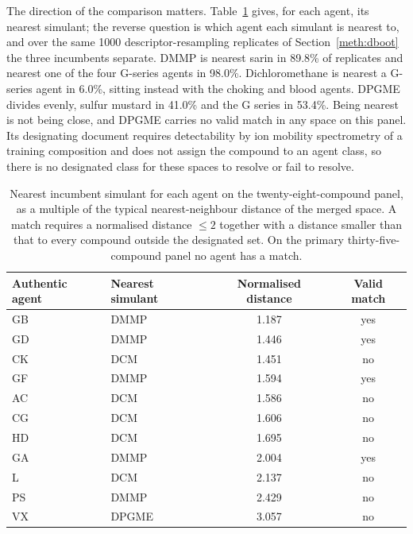 \documentclass[1p,times]{elsarticle}
\begin{document}
The direction of the comparison matters. Table~\ref{tab:match} gives, for each
agent, its nearest simulant; the reverse question is which agent each simulant
is nearest to, and over the same 1000 descriptor-resampling replicates of
Section~\ref{meth:dboot} the three incumbents separate. DMMP is nearest sarin in
89.8\% of replicates and nearest one of the four G-series agents in 98.0\%.
Dichloromethane is nearest a G-series agent in 6.0\%, sitting instead with the
choking and blood agents. DPGME divides evenly, sulfur mustard in 41.0\% and the
G series in 53.4\%. %
Being nearest is not being close, and DPGME carries no valid
match in any space on this panel. Its designating document requires
detectability by ion mobility spectrometry of a training composition and does
not assign the compound to an agent class,\cite{seitzinger2006simulant} so
there is no designated class for these spaces to resolve or fail to resolve.

\begin{table}[!htb]
\centering
\caption{Nearest incumbent simulant for each agent on the twenty-eight-compound
panel, as a multiple of the typical nearest-neighbour distance of the merged
space. A match requires a normalised distance $\le 2$ together with a distance
smaller than that to every compound outside the designated set. On the primary
thirty-five-compound panel no agent has a match.}
\label{tab:match}
\small
\begin{tabular}{llcc}
\hline
Authentic agent & Nearest simulant & Normalised distance & Valid match \\
\hline
GB & DMMP & 1.187 & yes \\
GD & DMMP & 1.446 & yes \\
CK & DCM & 1.451 & no \\
GF & DMMP & 1.594 & yes \\
AC & DCM & 1.586 & no \\
CG & DCM & 1.606 & no \\
HD & DCM & 1.695 & no \\
GA & DMMP & 2.004 & yes \\
L & DCM & 2.137 & no \\
PS & DMMP & 2.429 & no \\
VX & DPGME & 3.057 & no \\
\hline
\end{tabular}
\end{table}
\end{document}
